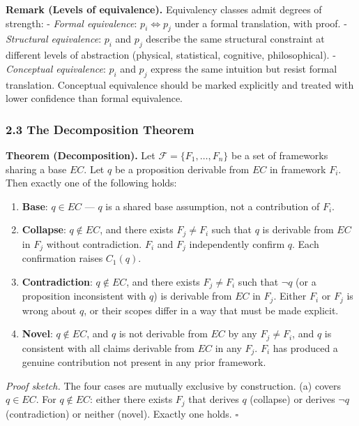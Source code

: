 \documentclass[
]{article}
\begin{document}
\textbf{Remark (Levels of equivalence).} Equivalency classes admit
degrees of strength: - \emph{Formal equivalence}:
\(p_i \Leftrightarrow p_j\) under a formal translation, with proof. -
\emph{Structural equivalence}: \(p_i\) and \(p_j\) describe the same
structural constraint at different levels of abstraction (physical,
statistical, cognitive, philosophical). - \emph{Conceptual equivalence}:
\(p_i\) and \(p_j\) express the same intuition but resist formal
translation. Conceptual equivalence should be marked explicitly and
treated with lower confidence than formal equivalence.

\subsubsection{2.3 The Decomposition
Theorem}\label{the-decomposition-theorem}

\textbf{Theorem (Decomposition).} Let
\(\mathcal{F} = \{F_1, \ldots, F_n\}\) be a set of frameworks sharing a
base \(EC\). Let \(q\) be a proposition derivable from \(EC\) in
framework \(F_i\). Then exactly one of the following holds:

\begin{enumerate}
\def\labelenumi{(\alph{enumi})}
\item
  \textbf{Base}: \(q \in EC\) --- \(q\) is a shared base assumption, not
  a contribution of \(F_i\).
\item
  \textbf{Collapse}: \(q \notin EC\), and there exists \(F_j \neq F_i\)
  such that \(q\) is derivable from \(EC\) in \(F_j\) without
  contradiction. \(F_i\) and \(F_j\) independently confirm \(q\). Each
  confirmation raises \(C_1(q)\).
\item
  \textbf{Contradiction}: \(q \notin EC\), and there exists
  \(F_j \neq F_i\) such that \(\neg q\) (or a proposition inconsistent
  with \(q\)) is derivable from \(EC\) in \(F_j\). Either \(F_i\) or
  \(F_j\) is wrong about \(q\), or their scopes differ in a way that
  must be made explicit.
\item
  \textbf{Novel}: \(q \notin EC\), and \(q\) is not derivable from
  \(EC\) by any \(F_j \neq F_i\), and \(q\) is consistent with all
  claims derivable from \(EC\) in any \(F_j\). \(F_i\) has produced a
  genuine contribution not present in any prior framework.
\end{enumerate}

\emph{Proof sketch.} The four cases are mutually exclusive by
construction. (a) covers \(q \in EC\). For \(q \notin EC\): either there
exists \(F_j\) that derives \(q\) (collapse) or derives \(\neg q\)
(contradiction) or neither (novel). Exactly one holds. \(\square\)
\end{document}
